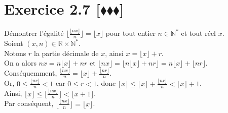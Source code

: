 \documentclass[10pt]{article}
\begin{document}

\section*{Exercice 2.7 [$\blacklozenge\blacklozenge\blacklozenge$]}
\begin{tcolorbox}[enhanced, width=6in, center, size=fbox, fontupper=\large, drop shadow southwest]
    Démontrer l'égalité $\lfloor\frac{\lfloor{nx}\rfloor}{n}\rfloor=\lfloor{x}\rfloor$ pour tout entier $n\in\mathbb{N}^*$ et tout réel $x$.\\
    Soient $(x,n)\in\mathbb{R}\times\mathbb{N}^*$.\\
    Notons $r$ la partie décimale de $x$, ainsi $x=\lfloor{x}\rfloor+r$.\\
    On a alors $nx=n\lfloor{x}\rfloor+nr$ et $\lfloor{nx}\rfloor=\lfloor{n\lfloor{x}\rfloor+nr}\rfloor=n\lfloor{x}\rfloor+\lfloor{nr}\rfloor$.\\
    Conséquemment, $\frac{\lfloor{nx}\rfloor}{n}=\lfloor{x}\rfloor+\frac{\lfloor{nr}\rfloor}{n}$.\\
    Or, $0\leq\frac{\lfloor{nr}\rfloor}{n}<1$ car $0\leq r<1$, donc $\lfloor{x}\rfloor\leq\lfloor{x}\rfloor+\frac{\lfloor{nr}\rfloor}{n}<\lfloor{x}\rfloor+1$.\\
    Ainsi, $\lfloor{x}\rfloor\leq\lfloor\frac{\lfloor{nx}\rfloor}{n}\rfloor<\lfloor{x}+1\rfloor$.\\
    Par conséquent, $\lfloor\frac{\lfloor{nx}\rfloor}{n}\rfloor = \lfloor{x}\rfloor$.
\end{tcolorbox}
\end{document}
